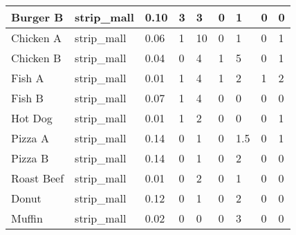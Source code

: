 \begin{table}[]
\begin{tabular}{|l|l|l|l|l|l|l|l|l|}
    Burger B                 & strip\_mall                     & 0.10                               & 3                & 3              & 0                & 1             & 0              & 0                \\ \hline
    Chicken A                & strip\_mall                     & 0.06                               & 1                & 10             & 0                & 1             & 0              & 1                \\ \hline
    Chicken B                & strip\_mall                     & 0.04                               & 0                & 4              & 1                & 5             & 0              & 1                \\ \hline
    Fish A                   & strip\_mall                     & 0.01                               & 1                & 4              & 1                & 2             & 1              & 2                \\ \hline
    Fish B                   & strip\_mall                     & 0.07                               & 1                & 4              & 0                & 0             & 0              & 0                \\ \hline
    Hot Dog                  & strip\_mall                     & 0.01                               & 1                & 2              & 0                & 0             & 0              & 1                \\ \hline
    Pizza A                  & strip\_mall                     & 0.14                               & 0                & 1              & 0                & 1.5           & 0              & 1                \\ \hline
    Pizza B                  & strip\_mall                     & 0.14                               & 0                & 1              & 0                & 2             & 0              & 0                \\ \hline
    Roast Beef               & strip\_mall                     & 0.01                               & 0                & 2              & 0                & 1             & 0              & 0                \\ \hline
    Donut                    & strip\_mall                     & 0.12                               & 0                & 1              & 0                & 2             & 0              & 0                \\ \hline
    Muffin                   & strip\_mall                     & 0.02                               & 0                & 0              & 0                & 3             & 0              & 0                \\ \hline

\end{tabular}
\end{table}
